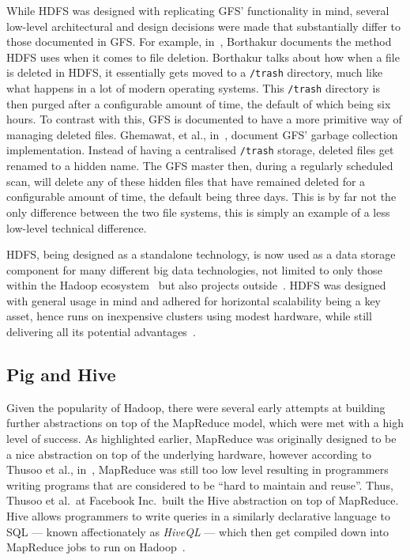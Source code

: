 While HDFS was designed with replicating GFS' functionality in mind, several low-level architectural and design decisions
were made that substantially differ to those documented in GFS. For example, in~\cite{borthakur2007hadoop}, Borthakur
documents the method HDFS uses when it comes to file deletion. Borthakur talks about how when a file is deleted in HDFS,
it essentially gets moved to a \texttt{/trash} directory, much like what happens in a lot of modern operating systems.
This \texttt{/trash} directory is then purged after a configurable amount of time, the default of which being six hours.
To contrast with this, GFS is documented to have a more primitive way of managing deleted files. Ghemawat, et al.,
in~\cite{ghemawat_google_2003}, document GFS' garbage collection implementation. Instead of having a centralised
\texttt{/trash} storage, deleted files get renamed to a hidden name. The GFS master then, during a regularly scheduled
scan, will delete any of these hidden files that have remained deleted for a configurable amount of time, the default
being three days. This is by far not the only difference between the two file systems, this is simply an example of a
less low-level technical difference.

HDFS, being designed as a standalone technology, is now used as a data storage component for many different big data
technologies, not limited to only those within the Hadoop ecosystem~\cite{taylor2010overview} but also projects
outside~\cite{xin2013graphx,yang2013big}. HDFS was designed with general usage in mind and adhered for horizontal
scalability being a key asset, hence runs on inexpensive clusters using modest hardware, while still delivering all
its potential advantages~\cite{borthakur2008hdfs}.



\subsection{Pig and Hive} %
\label{ssub:pig_and_hive}

Given the popularity of Hadoop, there were several early attempts at building further abstractions on top of the
MapReduce model, which were met with a high level of success. As highlighted earlier, MapReduce was originally designed
to be a nice abstraction on top of the underlying hardware, however according to Thusoo et al., in~\cite{thusoo2009hive},
MapReduce was still too low level resulting in programmers writing programs that are considered to be ``hard to maintain
and reuse''. Thus, Thusoo et al.\ at Facebook Inc.\ built the Hive abstraction on top of MapReduce. Hive allows
programmers to write queries in a similarly declarative language to SQL --- known affectionately as \textit{HiveQL} ---
which then get compiled down into MapReduce jobs to run on Hadoop~\cite{thusoo2010hive}.


